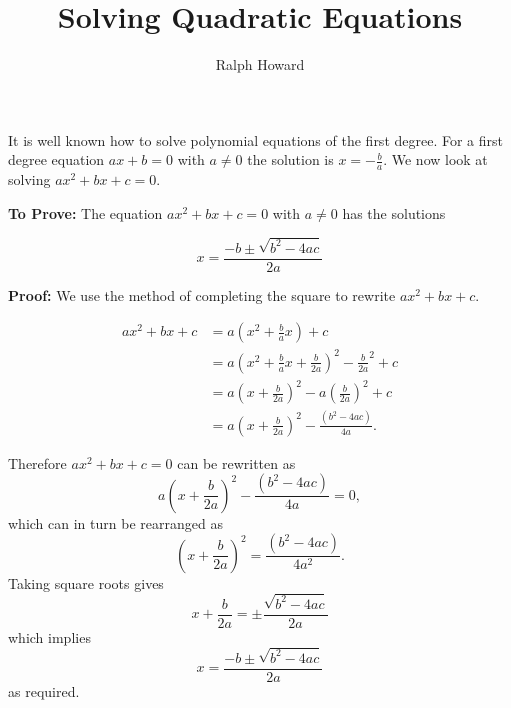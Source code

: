 \documentclass[11pt]{article}
\title{\LARGE \bf Solving Quadratic Equations}
\author{\Large  Ralph Howard}
\begin{document}
\maketitle 

It is well known how to solve polynomial equations of the first
degree. For a first degree equation $ax+b=0$ with $a \neq 0$ the
solution is $x=-\frac{b}{a}$.  We now look at solving $ax^2+bx+c=0$.

\textbf{To Prove:}
The equation $ax^2+bx+c=0$ with $a \neq 0$ has the solutions

\begin{equation}
x=\frac{-b \pm \sqrt{b^2-4ac}}{2a}
\end{equation}

\textbf{Proof:}
We use the method of completing the square to rewrite $ax^2+bx+c$.

\begin{align}
ax^2+bx+c &= a \left( x^2 + \frac{b}{a} x \right)+c \\
&=a\left(x^2 + \frac{b}{a} x + \frac{b}{2a} \right)^2 -\frac{b}{2a}^2 +c\\
&=a\left(x + \frac{b}{2a}\right)^2 -  a\left(\frac{b}{2a}\right)^2+c \\
&=a\left(x+\frac{b}{2a}\right)^2 - \frac{\left(b^2-4ac\right)}{4a}.
\end{align}

Therefore $ax^2+bx+c=0$ can be rewritten as 
\begin{equation}
a\left(x+\frac{b}{2a}\right)^2 - \frac{\left(b^2-4ac\right)}{4a}=0,
\end{equation}
which can in turn  be rearranged as
\begin{equation}
\left(x+\frac{b}{2a}\right)^2= \frac{\left(b^2-4ac\right)}{4a^2}.
\end{equation}
Taking square roots gives
\begin{equation}
x+\frac{b}{2a}= \pm \frac{\sqrt{b^2-4ac}}{2a}
\end{equation}
which implies
\begin{equation}
x=\frac{-b \pm \sqrt{b^2-4ac}}{2a}
\end{equation}
as required.
\end{document}
